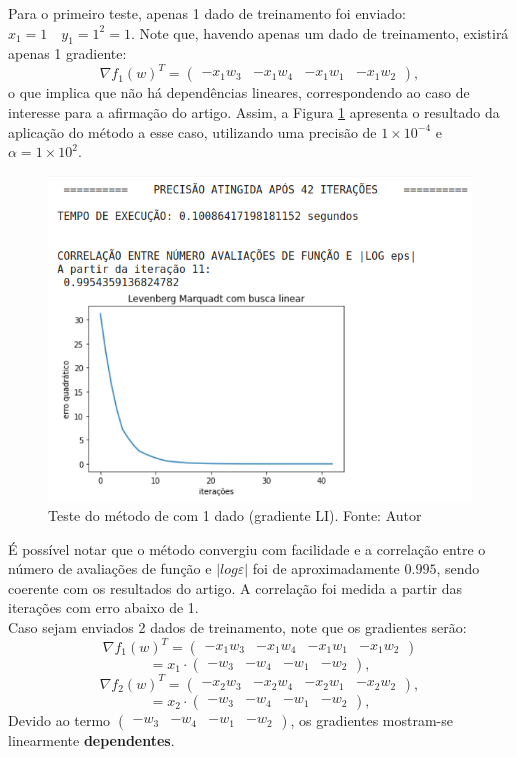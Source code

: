 \documentclass[11pt]{article}
\begin{document}
Para o primeiro teste, apenas 1 dado de treinamento foi enviado: $x_1 = 1 \quad y_1 = 1^2 = 1$.
Note que, havendo apenas um dado de treinamento, existirá apenas 1 gradiente:
$$\nabla f_1(w)^T = \begin{pmatrix}-x_1 w_3 & -x_1 w_4 & -x_1 w_1 & -x_1 w_2  \end{pmatrix},$$
o que implica que não há dependências lineares, correspondendo ao caso de interesse para a afirmação do artigo.
Assim, a Figura \ref{lmbl1} apresenta o resultado da aplicação do método a esse caso, utilizando uma precisão de $1\times10^{-4}$ e $\alpha = 1\times10^{2}$.

\begin{figure}[H]
\center
\includegraphics[scale=0.7]{Figuras/lmbl1.png}
\caption{Teste do método de  \cite{bmLS} com 1 dado (gradiente LI). Fonte: Autor} 
\label{lmbl1}
\end{figure}

É possível notar que o método convergiu com facilidade e a correlação entre o número de avaliações de função e $|log \varepsilon|$ foi de aproximadamente $0.995$, sendo coerente com os resultados do artigo. A correlação foi medida a partir das iterações com erro abaixo de 1.\\

Caso sejam enviados 2 dados de treinamento, note que os gradientes serão:
$$\nabla f_1(w)^T = \begin{pmatrix}-x_1 w_3 & -x_1 w_4 & -x_1 w_1 & -x_1 w_2  \end{pmatrix}$$
$$ = x_1 \cdot \begin{pmatrix}-w_3 & -w_4 & -w_1 & - w_2  \end{pmatrix},$$
$$\nabla f_2(w)^T = \begin{pmatrix}-x_2 w_3 & -x_2 w_4 & -x_2 w_1 & -x_2 w_2  \end{pmatrix},$$
$$ = x_2 \cdot \begin{pmatrix}-w_3 & -w_4 & -w_1 & - w_2  \end{pmatrix},$$
Devido ao termo $\begin{pmatrix}-w_3 & -w_4 & -w_1 & - w_2  \end{pmatrix}$, os gradientes mostram-se linearmente \textbf{dependentes}.
\end{document}
